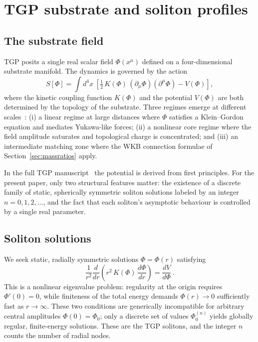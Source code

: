 \documentclass[11pt,a4paper]{article}
\begin{document}
\section{TGP substrate and soliton profiles}\label{sec:substrate}

\subsection{The substrate field}

TGP posits a single real scalar field $\Phi(x^\mu)$ defined on a
four-dimensional substrate manifold.  The dynamics is governed by the
action
\begin{equation}\label{eq:action}
  S[\Phi] = \int d^4x\;\left[
    \tfrac{1}{2}\,K(\Phi)\,(\partial_\mu\Phi)(\partial^\mu\Phi)
    - V(\Phi)
  \right],
\end{equation}
where the kinetic coupling function $K(\Phi)$ and the potential
$V(\Phi)$ are both determined by the topology of the substrate.
Three regimes emerge at different scales~\cite{Serafin2026-full}:
(i) a linear regime at large distances where $\Phi$ satisfies a
Klein--Gordon equation and mediates Yukawa-like forces;
(ii) a nonlinear core regime where the field amplitude saturates
and topological charge is concentrated; and
(iii) an intermediate matching zone where the WKB connection formulae
of Section~\ref{sec:massratios} apply.

In the full TGP manuscript~\cite{Serafin2026-full} the potential
is derived from first principles.  For the present paper,
only two structural features matter: the existence of a discrete
family of static, spherically symmetric soliton solutions labeled
by an integer $n = 0,1,2,\ldots$, and the fact that each soliton's
asymptotic behaviour is controlled by a single real parameter.

\subsection{Soliton solutions}

We seek static, radially symmetric solutions $\Phi = \Phi(r)$
satisfying
\begin{equation}\label{eq:radialODE}
  \frac{1}{r^2}\frac{d}{dr}\!\left(r^2\,K(\Phi)\,\frac{d\Phi}{dr}\right)
  = \frac{dV}{d\Phi}\,.
\end{equation}
This is a nonlinear eigenvalue problem: regularity at the origin
requires $\Phi'(0) = 0$, while finiteness of the total energy
demands $\Phi(r) \to 0$ sufficiently fast as $r\to\infty$.
These two conditions are generically incompatible for arbitrary
central amplitudes $\Phi(0) = \Phi_0$; only a discrete set of
values $\Phi_0^{(n)}$ yields globally regular, finite-energy
solutions.  These are the TGP solitons, and the integer $n$ counts
the number of radial nodes.
\end{document}
